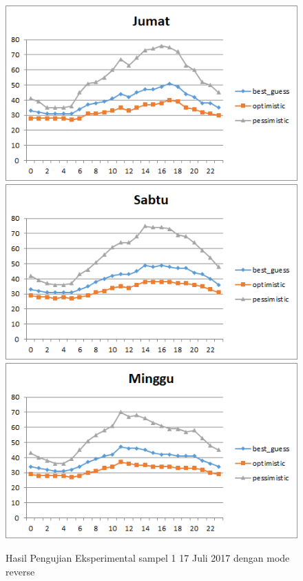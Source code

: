 \begin{figure}[H]
				\centering		
				\includegraphics[]{Gambar/jumatsampel117072017reverse.png}
				\includegraphics[]{Gambar/sabtusampel117072017reverse.png}
				\includegraphics[]{Gambar/minggusampel117072017reverse.png}
				\caption[Hasil Pengujian Eksperimental]{Hasil Pengujian Eksperimental sampel 1 17 Juli 2017 dengan mode reverse}
				\label{fig:eksperimentalsampel117072017reverse}
\end{figure}	
\newpage
			
